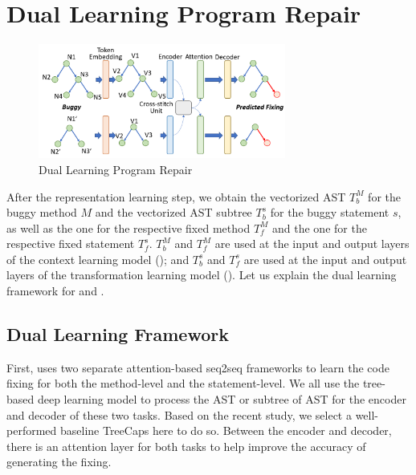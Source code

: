 \section{Dual Learning Program Repair}

\begin{figure}[t]
	\centering
	\includegraphics[width=3.2in]{graphs/program_repair.png}
	\caption{Dual Learning Program Repair}
	\label{program-repair}
\end{figure}

After the representation learning step, we obtain the vectorized AST
$T^{M}_b$ for the buggy method $M$ and the vectorized AST subtree
$T^{s}_b$ for the buggy statement $s$, as well as the one for the
respective fixed method $T^{M}_f$ and the one for the respective fixed
statement $T^{s}_f$. $T^{M}_b$ and $T^{M}_f$ are used at the input and
output layers of the context learning model (); and
$T^{s}_b$ and $T^{s}_f$ are used at the input and output layers of the
transformation learning model (). Let us explain the dual
learning framework for  and .



\subsection{Dual Learning Framework}



First, \tool uses two separate attention-based seq2seq frameworks to learn the code fixing for both the method-level and the statement-level. We all use the tree-based deep learning model to process the AST or subtree of AST for the encoder and decoder of these two tasks. Based on the recent study, we select a well-performed baseline TreeCaps \cite{bui2021treecaps} here to do so. Between the encoder and decoder, there is an attention layer for both tasks to help improve the accuracy of generating the fixing.

